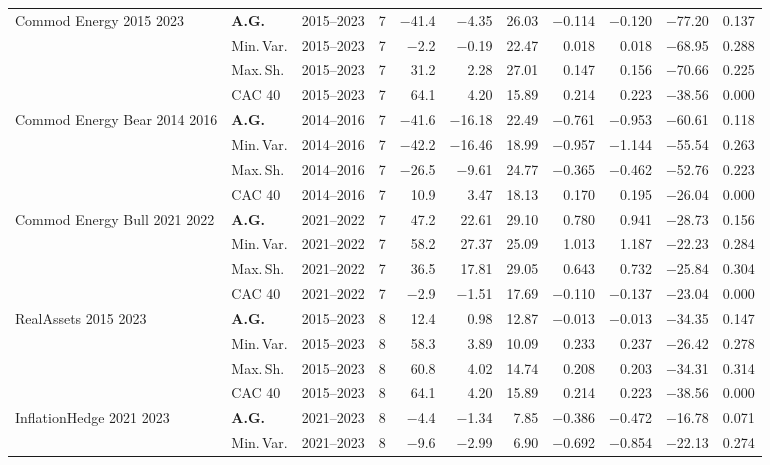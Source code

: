 \begin{longtable}{p{2.6cm} l c c r r r r r r r}
\midrule
Commod Energy 2015 2023 & \textbf{A.G.} & 2015--2023 & 7 & $-$41.4 & $-$4.35 & 26.03 & $-$0.114 & $-$0.120 & $-$77.20 & 0.137 \\
 & Min.\,Var. & 2015--2023 & 7 & $-$2.2 & $-$0.19 & 22.47 & 0.018 & 0.018 & $-$68.95 & 0.288 \\
 & Max.\,Sh. & 2015--2023 & 7 & 31.2 & 2.28 & 27.01 & 0.147 & 0.156 & $-$70.66 & 0.225 \\
 & CAC 40 & 2015--2023 & 7 & 64.1 & 4.20 & 15.89 & 0.214 & 0.223 & $-$38.56 & 0.000 \\
\midrule
Commod Energy Bear 2014 2016 & \textbf{A.G.} & 2014--2016 & 7 & $-$41.6 & $-$16.18 & 22.49 & $-$0.761 & $-$0.953 & $-$60.61 & 0.118 \\
 & Min.\,Var. & 2014--2016 & 7 & $-$42.2 & $-$16.46 & 18.99 & $-$0.957 & $-$1.144 & $-$55.54 & 0.263 \\
 & Max.\,Sh. & 2014--2016 & 7 & $-$26.5 & $-$9.61 & 24.77 & $-$0.365 & $-$0.462 & $-$52.76 & 0.223 \\
 & CAC 40 & 2014--2016 & 7 & 10.9 & 3.47 & 18.13 & 0.170 & 0.195 & $-$26.04 & 0.000 \\
\midrule
Commod Energy Bull 2021 2022 & \textbf{A.G.} & 2021--2022 & 7 & 47.2 & 22.61 & 29.10 & 0.780 & 0.941 & $-$28.73 & 0.156 \\
 & Min.\,Var. & 2021--2022 & 7 & 58.2 & 27.37 & 25.09 & 1.013 & 1.187 & $-$22.23 & 0.284 \\
 & Max.\,Sh. & 2021--2022 & 7 & 36.5 & 17.81 & 29.05 & 0.643 & 0.732 & $-$25.84 & 0.304 \\
 & CAC 40 & 2021--2022 & 7 & $-$2.9 & $-$1.51 & 17.69 & $-$0.110 & $-$0.137 & $-$23.04 & 0.000 \\
\midrule
RealAssets 2015 2023 & \textbf{A.G.} & 2015--2023 & 8 & 12.4 & 0.98 & 12.87 & $-$0.013 & $-$0.013 & $-$34.35 & 0.147 \\
 & Min.\,Var. & 2015--2023 & 8 & 58.3 & 3.89 & 10.09 & 0.233 & 0.237 & $-$26.42 & 0.278 \\
 & Max.\,Sh. & 2015--2023 & 8 & 60.8 & 4.02 & 14.74 & 0.208 & 0.203 & $-$34.31 & 0.314 \\
 & CAC 40 & 2015--2023 & 8 & 64.1 & 4.20 & 15.89 & 0.214 & 0.223 & $-$38.56 & 0.000 \\
\midrule
InflationHedge 2021 2023 & \textbf{A.G.} & 2021--2023 & 8 & $-$4.4 & $-$1.34 & 7.85 & $-$0.386 & $-$0.472 & $-$16.78 & 0.071 \\
 & Min.\,Var. & 2021--2023 & 8 & $-$9.6 & $-$2.99 & 6.90 & $-$0.692 & $-$0.854 & $-$22.13 & 0.274 \\

\end{longtable}
